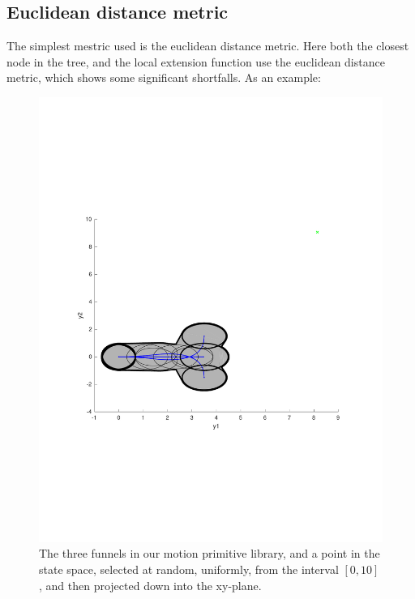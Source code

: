 \subsection{Euclidean distance metric}

The simplest mestric used is the euclidean distance metric. Here both the
closest node in the tree, and the local extension function use the euclidean
distance metric, which shows some significant shortfalls. As an example:

\begin{figure}
\includegraphics[scale=.5]{figures/rrtfunnel/euclidean-distance-closest-funnel1}
\caption{The three funnels in our motion primitive library, and a point in the
  state space,  selected at random, uniformly, from the interval \([0,10]\), and
  then projected down into the xy-plane.}
\end{figure}

